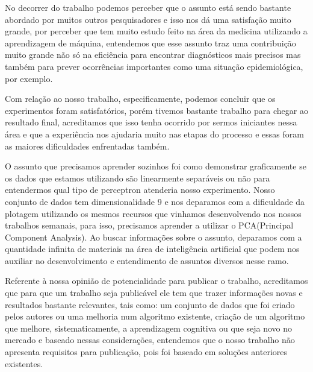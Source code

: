 \documentclass[conference]{IEEEtran}
\begin{document}
  No decorrer do trabalho podemos perceber que o assunto está sendo bastante abordado por muitos outros pesquisadores e isso nos dá uma satisfação muito grande, por perceber que tem muito estudo feito na área da medicina utilizando a aprendizagem de máquina, entendemos que esse assunto traz uma contribuição muito grande não só na eficiência para encontrar diagnósticos mais precisos mas também para prever ocorrências importantes como uma situação epidemiológica, por exemplo.

    Com relação ao nosso trabalho, especificamente, podemos concluir que os experimentos foram satisfatórios, porém tivemos bastante trabalho para chegar ao resultado final, acreditamos que isso tenha ocorrido por sermos iniciantes nessa área e que a experiência nos ajudaria muito nas etapas do processo e essas foram as maiores dificuldades enfrentadas também.
    
    O assunto que precisamos aprender sozinhos foi como demonstrar graficamente se os dados que estamos utilizando são linearmente separáveis ou não para entendermos qual tipo de perceptron atenderia nosso experimento. Nosso conjunto de dados tem dimensionalidade 9 e nos deparamos com a dificuldade da plotagem utilizando os mesmos recursos que vinhamos desenvolvendo nos nossos trabalhos semanais, para isso, precisamos aprender a utilizar o PCA(Principal Component Analysis). Ao buscar informações sobre o assunto, deparamos com a quantidade infinita de materiais na área de inteligência artificial que podem nos auxiliar no desenvolvimento e entendimento de assuntos diversos nesse ramo.
    
    Referente à nossa opinião de potencialidade para publicar o trabalho, acreditamos que para que um trabalho seja publicável ele tem que trazer informações novas e resultados bastante relevantes, tais como: um conjunto de dados que foi criado pelos autores ou uma melhoria num algoritmo existente, criação de um algoritmo que melhore, sistematicamente, a aprendizagem cognitiva ou que seja novo no mercado e baseado nessas considerações, entendemos que o nosso trabalho não apresenta requisitos para publicação, pois foi baseado em soluções anteriores existentes.
\end{document}
